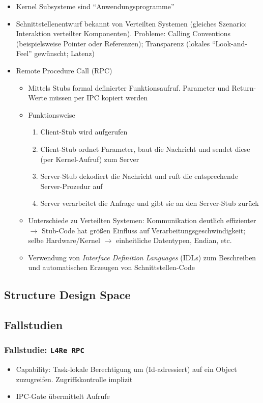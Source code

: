 \begin{itemize}
\begin{itemize}
		\begin{itemize}
			\item Kernel Subsysteme sind "`Anwendungsprogramme"'
			\item Schnittstellenentwurf bekannt von Verteilten Systemen (gleiches Szenario: Interaktion verteilter Komponenten). Probleme: Calling Conventions (beispielsweise Pointer oder Referenzen); Transparenz (lokales "`Look-and-Feel"' gewünscht; Latenz)
			\item Remote Procedure Call (RPC)
			\begin{itemize}
				\item Mittels Stubs formal definierter Funktionsaufruf. Parameter und Return-Werte müssen per IPC kopiert werden
				\item Funktionsweise
				\begin{enumerate}
					\item Client-Stub wird aufgerufen
					\item Client-Stub ordnet Parameter, baut die Nachricht und sendet diese (per Kernel-Aufruf) zum Server
					\item Server-Stub dekodiert die Nachricht und ruft die entsprechende Server-Prozedur auf
					\item Server verarbeitet die Anfrage und gibt sie an den Server-Stub zurück
				\end{enumerate}
				\item Unterschiede zu Verteilten Systemen: Kommunikation deutlich effizienter \(\rightarrow\) Stub-Code hat größen Einfluss auf Verarbeitungsgeschwindigkeit; selbe Hardware/Kernel \(\rightarrow\) einheitliche Datentypen, Endian, etc.
				\item Verwendung von \textit{Interface Definition Languages} (IDLs) zum Beschreiben und automatischen Erzeugen von Schnittstellen-Code
			\end{itemize}
		\end{itemize}
	\end{itemize}
\end{itemize}


\subsection{Structure Design Space}


\subsection{Fallstudien}

\subsubsection{Fallstudie: \texttt{L4Re RPC}}
\begin{itemize}
	\item Capability: Task-lokale Berechtigung um (Id-adressiert) auf ein Object zuzugreifen. Zugriffskontrolle implizit
	\item IPC-Gate übermittelt Aufrufe
\end{itemize}

